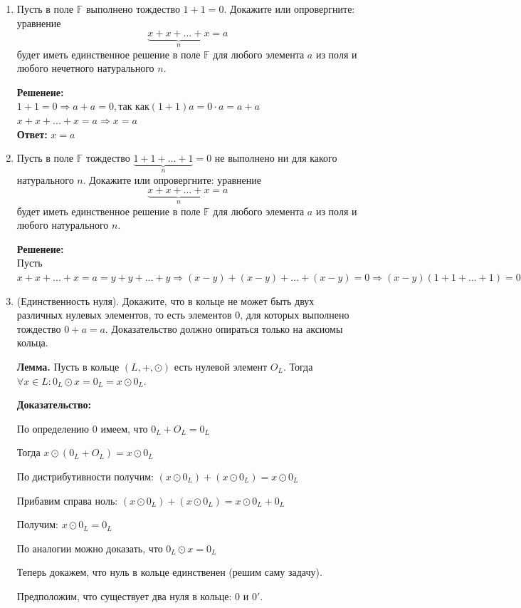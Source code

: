 \documentclass[]{book}
\theoremstyle{definition}
\newcommand{\bb}[1]{\mathbb{#1}}
\begin{document}
\begin{enumerate}[resume]
\item Пусть в поле $\bb{F}$ выполнено тождество $1+1 = 0$. Докажите или опровергните: уравнение  $$\underbrace{x + x + \ldots + x}_{n} = a$$ будет иметь единственное решение в поле $\bb{F}$ для любого элемента $a$ из поля и любого нечетного натурального $n$.

\textbf{Решенеие:}
\\
$1+1 = 0 \Longrightarrow a+a = 0, \text{так как} (1+1)a = 0\cdot a = a+a$\\
$x+x+...+x = a \Longrightarrow x = a$\\
\textbf{Ответ: } $x=a$



\item Пусть в поле $\bb{F}$ тождество  $\underbrace{1 + 1 + \ldots + 1}_{n} = 0$  не выполнено ни для какого натурального $n$. Докажите или опровергните: уравнение 
$$\underbrace{x + x + \ldots + x}_{n} = a$$ 
будет иметь единственное решение в поле $\bb{F}$ для любого элемента $a$ из поля и любого натурального $n$.

\textbf{Решенеие:}
\\
Пусть $x+x+...+x = a = y+y+...+y \Longrightarrow (x-y)+(x-y)+...+(x-y)=0 \Longrightarrow (x-y)(1+1+...+1) = 0 \Longrightarrow x = y$ 


\item (Единственность нуля). Докажите, что в кольце не может быть двух различных нулевых элементов, то есть элементов 0, для которых выполнено тождество $0 + a = a$. Доказательство должно опираться только на аксиомы кольца.

\textbf{Лемма.} Пусть в кольце $(L,+,\odot)$ есть нулевой элемент $O_{L}$. Тогда $\forall x \in L\colon 0_L \odot x = 0_L = x\odot 0_L$.

\textbf{Доказательство:}

По определению 0 имеем, что $0_L + O_L = 0_L$

Тогда $x\odot(0_L + O_L) = x\odot 0_L$

По дистрибутивности получим: $(x\odot0_L) + (x\odot0_L) = x\odot 0_L$

Прибавим справа ноль: $(x\odot0_L) + (x\odot0_L) = x\odot 0_L + 0_L$

Получим: $x\odot0_L = 0_L$

По аналогии можно доказать, что $0_L\odot x = 0_L$

Теперь докажем, что нуль в кольце единственен (решим саму задачу).

Предположим, что существует два нуля в кольце: $0$ и $0'$.


\end{enumerate}
\end{document}
